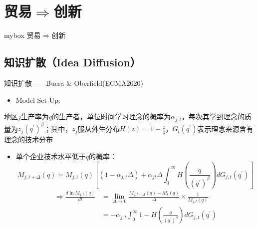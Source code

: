 \documentclass{beamer}
\begin{document}
\section{贸易\(\Longrightarrow\)创新}
\begin{frame}
\begin{center}
    \begin{minipage}{1\textwidth}
		\begin{beamercolorbox}[wd=0.70\textwidth, rounded=true, shadow=true]{mybox}
			\LARGE \centering 贸易\(\Longrightarrow\)创新
		\end{beamercolorbox}
    \end{minipage}
\end{center} 
\end{frame}

\subsection{知识扩散（Idea Diffusion）}
\begin{frame}{知识扩散——Buera \& Oberfield(ECMA2020)}
\begin{itemize}
    \item Model Set-Up:
\end{itemize}
地区\(j\)生产率为\(q\)的生产者，单位时间学习理念的概率为\(\alpha_{j,t}\)，每次其学到理念的质量为\(z_j\left(q^\prime\right)^\beta\)；其中，\(z_j\)服从外生分布\(H\left(z\right)=1-\frac{z}{\underline{z}}\)，\(G_t\left(q^\prime\right)\)表示理念来源含有理念的技术分布
\begin{itemize}
    \item 单个企业技术水平低于\(q\)的概率：
    \[M_{j,t+\Delta}(q)=M_{j,t}(q)\left[\left(1-\alpha_{j,t}\Delta\right)+\alpha_{jt}\Delta\int_{0}^{\infty}H(\frac{q}{\left(q^{\prime}\right)^{\beta}})dG_{j,t}(q^{\prime})\right]\]
\begin{align*}
    \Longrightarrow\frac{d\ln M_{j,t}(q)}{dt}&=\lim_{\Delta\rightarrow0}\frac{M_{j,t+\Delta}(q)-M_{t}(q)}{\Delta}\times\frac{1}{M_{j,t}(q)}\\&=-\alpha_{j,t}\int_{0}^{\infty}1-H(\frac{q}{\left(q^{\prime}\right)^{\beta}})d{G}_{j,t}(q^{\prime})
\end{align*}
\end{itemize}
\end{frame}
\end{document}
